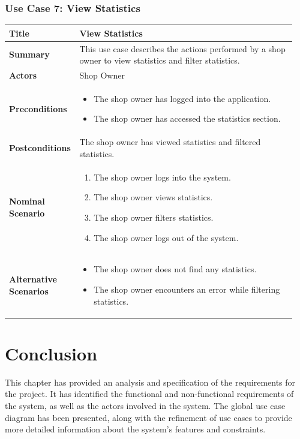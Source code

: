 \subsubsection{Use Case 7: View Statistics}
\begin{longtable}{|p{0.2\linewidth}|p{0.75\linewidth}|}
\hline
\textbf{Title} & View Statistics \\
\hline
\textbf{Summary} & This use case describes the actions performed by a shop owner to view statistics and filter statistics. \\
\hline
\textbf{Actors} & Shop Owner \\
\hline
\textbf{Preconditions} &
\begin{itemize}
    \item The shop owner has logged into the application.
    \item The shop owner has accessed the statistics section.
\end{itemize} \\
\hline
\textbf{Postconditions} & The shop owner has viewed statistics and filtered statistics. \\
\hline
\textbf{Nominal Scenario} &
\begin{enumerate}
    \item The shop owner logs into the system.
    \item The shop owner views statistics.
    \item The shop owner filters statistics.
    \item The shop owner logs out of the system.
\end{enumerate} \\
\hline
\textbf{Alternative Scenarios} &
\begin{itemize}
    \item The shop owner does not find any statistics.
    \item The shop owner encounters an error while filtering statistics.
\end{itemize} \\
\hline
\end{longtable}

\section{Conclusion}
This chapter has provided an analysis and specification of the requirements for the project. It has identified the functional and non-functional requirements of the system, as well as the actors involved in the system. The global use case diagram has been presented, along with the refinement of use cases to provide more detailed information about the system's features and constraints.